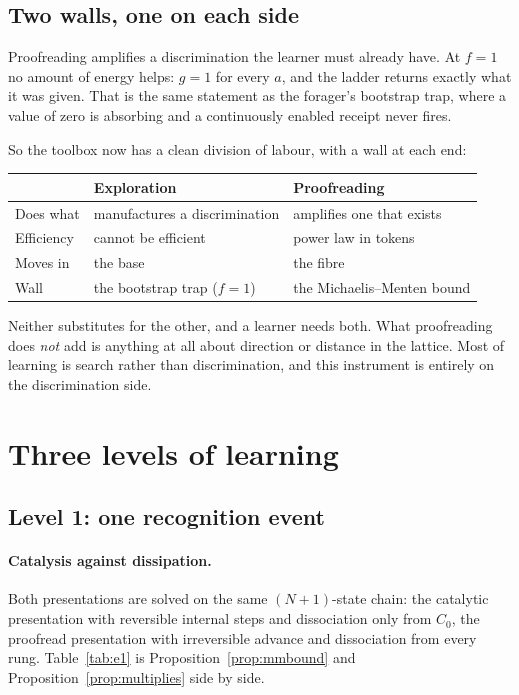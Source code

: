 \documentclass[11pt]{article}
\theoremstyle{plain}
\theoremstyle{definition}
\theoremstyle{remark}
\begin{document}
\subsection{Two walls, one on each side}

Proofreading amplifies a discrimination the learner must already have. At
$f = 1$ no amount of energy helps: $g = 1$ for every $a$, and the ladder
returns exactly what it was given. That is the same statement as the forager's
bootstrap trap, where a value of zero is absorbing and a continuously enabled
receipt never fires.

So the toolbox now has a clean division of labour, with a wall at each end:

\begin{center}
\begin{tabular}{@{}lll@{}}
\toprule
 & \textbf{Exploration} & \textbf{Proofreading} \\
\midrule
Does what & manufactures a discrimination & amplifies one that exists \\
Efficiency & cannot be efficient & power law in tokens \\
Moves in & the base & the fibre \\
Wall & the bootstrap trap ($f = 1$) & the Michaelis--Menten bound \\
\bottomrule
\end{tabular}
\end{center}

Neither substitutes for the other, and a learner needs both. What
proofreading does \emph{not} add is anything at all about direction or
distance in the lattice. Most of learning is search rather than
discrimination, and this instrument is entirely on the discrimination side.

\section{Three levels of learning}

\subsection{Level 1: one recognition event}
\label{sec:l1}

\paragraph{Catalysis against dissipation.}
Both presentations are solved on the same $(N{+}1)$-state chain: the catalytic
presentation with reversible internal steps and dissociation only from $C_0$,
the proofread presentation with irreversible advance and dissociation from
every rung. Table~\ref{tab:e1} is Proposition~\ref{prop:mmbound} and
Proposition~\ref{prop:multiplies} side by side.
\end{document}
